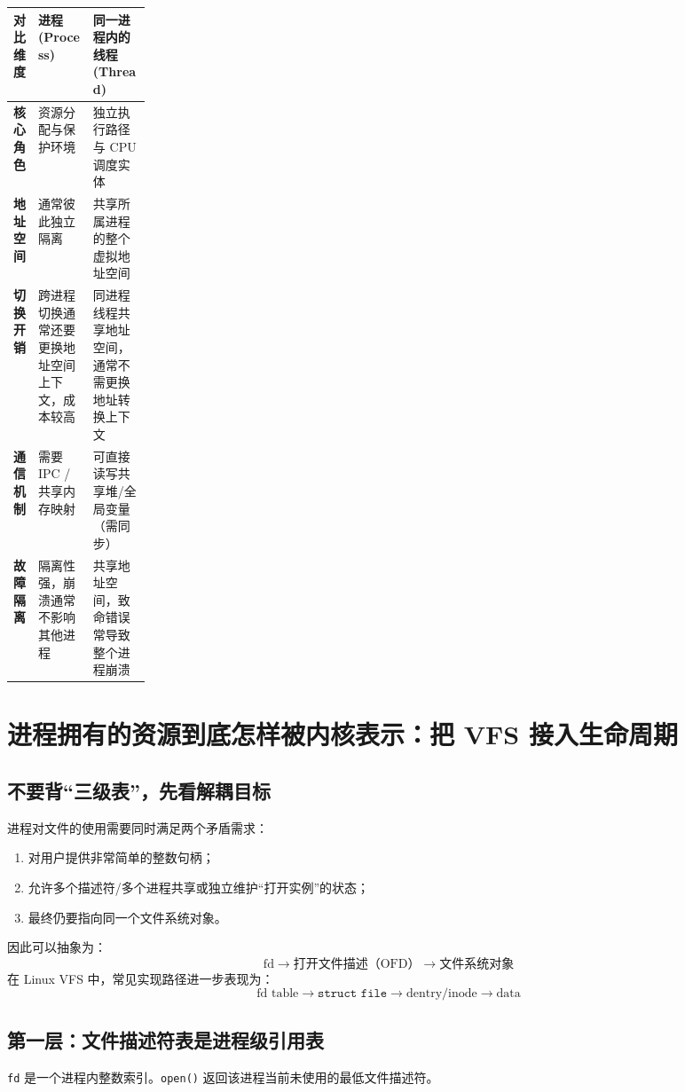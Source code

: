 \documentclass[11pt,a4paper]{ctexart}
\newcommand{\code}[1]{\texttt{#1}}
\begin{document}
\begingroup
\small
\renewcommand{\arraystretch}{1.25}
\setlength{\tabcolsep}{6pt}
\begin{tabularx}{\linewidth}{>{\bfseries}p{0.18\linewidth} X X}
\toprule
对比维度 & 进程 (Process) & 同一进程内的线程 (Thread)\\
\midrule
核心角色 & 资源分配与保护环境 & 独立执行路径与 CPU 调度实体\\
地址空间 & 通常彼此独立隔离 & 共享所属进程的整个虚拟地址空间\\
切换开销 & 跨进程切换通常还要更换地址空间上下文，成本较高 & 同进程线程共享地址空间，通常不需更换地址转换上下文\\
通信机制 & 需要 IPC / 共享内存映射 & 可直接读写共享堆/全局变量（需同步）\\
故障隔离 & 隔离性强，崩溃通常不影响其他进程 & 共享地址空间，致命错误常导致整个进程崩溃\\
\bottomrule
\end{tabularx}
\endgroup

\section{进程拥有的资源到底怎样被内核表示：把 VFS 接入生命周期}

\subsection{不要背“三级表”，先看解耦目标}

进程对文件的使用需要同时满足两个矛盾需求：
\begin{enumerate}
\item 对用户提供非常简单的整数句柄；
\item 允许多个描述符/多个进程共享或独立维护“打开实例”的状态；
\item 最终仍要指向同一个文件系统对象。
\end{enumerate}

因此可以抽象为：
\[
\boxed{\text{fd}\rightarrow\text{打开文件描述（OFD）}\rightarrow\text{文件系统对象}}
\]
在 Linux VFS 中，常见实现路径进一步表现为：
\[
\boxed{\text{fd table}\rightarrow\texttt{struct file}\rightarrow\text{dentry/inode}\rightarrow\text{data}}
\]

\subsection{第一层：文件描述符表是进程级引用表}

\code{fd} 是一个进程内整数索引。\code{open()} 返回该进程当前未使用的最低文件描述符。
\end{document}
